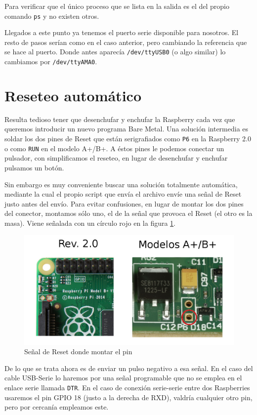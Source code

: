 Para verificar que el único proceso que se lista en la salida es el del propio comando {\tt ps}
y no existen otros.

Llegados a este punto ya tenemos el puerto serie disponible para nosotros. El resto de pasos
serían como en el caso anterior, pero cambiando la referencia que se hace al puerto. Donde
antes aparecía {\tt /dev/ttyUSB0} (o algo similar) lo cambiamos por {\tt /dev/ttyAMA0}.

\section{Reseteo automático}

Resulta tedioso tener que desenchufar y enchufar la Raspberry cada vez que queremos introducir
un nuevo programa Bare Metal. Una solución intermedia es soldar los dos pines de Reset que
están serigrafiados como {\tt P6} en la Raspberry 2.0 o como {\tt RUN} en el modelo A+/B+.
A éstos pines le podemos conectar un pulsador, con simplificamos el reseteo, en lugar de
desenchufar y enchufar pulsamos un botón.

Sin embargo es muy conveniente buscar una solución totalmente automática, mediante la cual
el propio script que envía el archivo envíe una señal de Reset justo antes del envío. Para
evitar confusiones, en lugar de montar los dos pines del conector, montamos sólo uno, el
de la señal que provoca el Reset (el otro es la masa). Viene señalada con un círculo rojo
en la figura \ref{fig:pinReset}.

\begin{figure}[h]
  \centering
    \includegraphics[width=14cm]{graphs/pinReset.jpg}
  \caption{Señal de Reset donde montar el pin}
  \label{fig:pinReset}
\end{figure}

De lo que se trata ahora es de enviar un pulso negativo a esa señal. En el caso del cable
USB-Serie lo haremos por una señal programable que no se emplea en el enlace serie llamada
{\tt DTR}. En el caso de conexión serie-serie entre dos Raspberries usaremos el pin GPIO 18
(justo a la derecha de RXD), valdría cualquier otro pin, pero por cercanía empleamos este.

